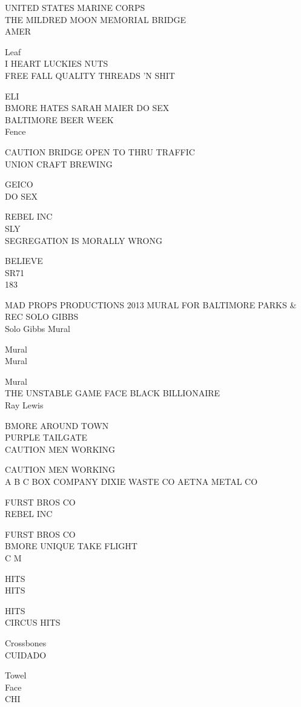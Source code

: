 \documentclass[10pt,letterpaper]{article}
\begin{document}
UNITED STATES MARINE CORPS\\
THE MILDRED MOON MEMORIAL BRIDGE\\
AMER

Leaf\\
I HEART LUCKIES NUTS\\
FREE FALL QUALITY THREADS 'N SHIT

ELI\\
BMORE HATES SARAH MAIER DO SEX\\
BALTIMORE BEER WEEK\\
Fence

CAUTION BRIDGE OPEN TO THRU TRAFFIC\\
UNION CRAFT BREWING

GEICO\\
DO SEX

REBEL INC\\
SLY\\
SEGREGATION IS MORALLY WRONG

BELIEVE\\
SR71\\
183

MAD PROPS PRODUCTIONS 2013 MURAL FOR BALTIMORE PARKS \& REC SOLO GIBBS\\
Solo Gibbs Mural

Mural\\
Mural

Mural\\
THE UNSTABLE GAME FACE BLACK BILLIONAIRE\\
Ray Lewis

BMORE AROUND TOWN\\
PURPLE TAILGATE\\
CAUTION MEN WORKING

CAUTION MEN WORKING\\
A B C BOX COMPANY DIXIE WASTE CO AETNA METAL CO

FURST BROS CO\\
REBEL INC

FURST BROS CO\\
BMORE UNIQUE TAKE FLIGHT\\
C M

HITS\\
HITS

HITS\\
CIRCUS HITS

Crossbones\\
CUIDADO

Towel\\
Face\\
CHI
\end{document}
